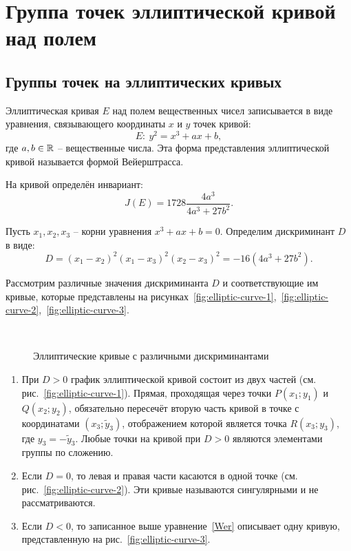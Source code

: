 \section{Группа точек эллиптической кривой над полем}\label{section-math-ec-groups}

\subsection{Группы точек на эллиптических кривых}

Эллиптическая кривая $E$ над полем вещественных чисел записывается в виде уравнения, связывающего координаты $x$ и $y$ точек кривой:
\begin{equation}
    E: ~ y^{2} = x^{3} + ax + b,
    \label{Wer}
\end{equation}
где $a,b \in \mathbb{R}$ -- вещественные числа. Эта форма представления эллиптической кривой называется формой Вейерштрасса.

На кривой определён инвариант:
\begin{equation}
    J(E)=1728\frac{4a^{3} }{4a^{3} +27b^{2} }.
\end{equation}

Пусть $x_{1} ,x_{2} ,x_{3} $ -- корни уравнения $x^3 + a x + b = 0$. Определим дискриминант $D$ в виде:
    \[ D =(x_1 - x_2)^2 (x_1 - x_3)^2 (x_2 - x_3)^2 = - 16(4 a^3 + 27 b^2). \]

Рассмотрим различные значения дискриминанта $D$ и соответствующие им кривые, которые представлены на рисунках~\ref{fig:elliptic-curve-1},~\ref{fig:elliptic-curve-2},~\ref{fig:elliptic-curve-3}.

\begin{figure}[thb]
	\centering
	~~~~
	~~~~
	\caption{Эллиптические кривые с различными дискриминантами}
\end{figure}

\begin{enumerate}
    \item При $D>0$ график эллиптической кривой состоит из двух частей (см. рис.~\ref{fig:elliptic-curve-1}). Прямая, проходящая через точки $P(x_1; y_1)$ и $Q(x_2; y_2)$, обязательно пересечёт вторую часть кривой в точке с координатами $(x_3; \widetilde{y}_3)$, отображением которой является точка $R(x_3; y_3)$, где $y_3 = - \widetilde{y}_3$. Любые точки на кривой при $D>0$ являются элементами группы по сложению.
    \item Если $D=0$, то левая и правая части касаются в одной точке (см. рис.~\ref{fig:elliptic-curve-2}). Эти кривые называются сингулярными и не рассматриваются.
    \item Если $D<0$, то записанное выше уравнение~\ref{Wer} описывает одну кривую, представленную на рис.~\ref{fig:elliptic-curve-3}.
\end{enumerate}

